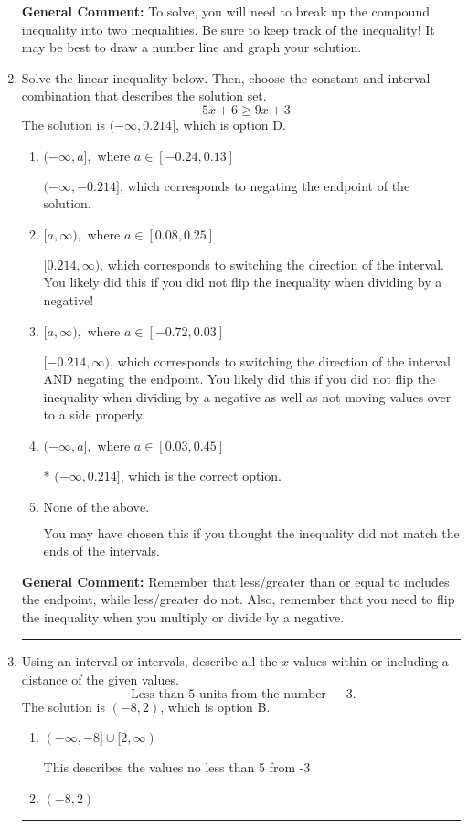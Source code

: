 \documentclass{extbook}[14pt]
\newcommand{\litem}[1]{\item #1

\rule{\textwidth}{0.4pt}}
\begin{document}
\begin{enumerate}
{\textbf{General Comment:} To solve, you will need to break up the compound inequality into two inequalities. Be sure to keep track of the inequality! It may be best to draw a number line and graph your solution.
}
\litem{
Solve the linear inequality below. Then, choose the constant and interval combination that describes the solution set.
\[ -5x + 6 \geq 9x + 3 \]The solution is \( (-\infty, 0.214] \), which is option D.\begin{enumerate}[label=\Alph*.]
\item \( (-\infty, a], \text{ where } a \in [-0.24, 0.13] \)

 $(-\infty, -0.214]$, which corresponds to negating the endpoint of the solution.
\item \( [a, \infty), \text{ where } a \in [0.08, 0.25] \)

 $[0.214, \infty)$, which corresponds to switching the direction of the interval. You likely did this if you did not flip the inequality when dividing by a negative!
\item \( [a, \infty), \text{ where } a \in [-0.72, 0.03] \)

 $[-0.214, \infty)$, which corresponds to switching the direction of the interval AND negating the endpoint. You likely did this if you did not flip the inequality when dividing by a negative as well as not moving values over to a side properly.
\item \( (-\infty, a], \text{ where } a \in [0.03, 0.45] \)

* $(-\infty, 0.214]$, which is the correct option.
\item \( \text{None of the above}. \)

You may have chosen this if you thought the inequality did not match the ends of the intervals.
\end{enumerate}

\textbf{General Comment:} Remember that less/greater than or equal to includes the endpoint, while less/greater do not. Also, remember that you need to flip the inequality when you multiply or divide by a negative.
}
\litem{
Using an interval or intervals, describe all the $x$-values within or including a distance of the given values.
\[ \text{ Less than } 5 \text{ units from the number } -3. \]The solution is \( (-8, 2) \), which is option B.\begin{enumerate}[label=\Alph*.]
\item \( (-\infty, -8] \cup [2, \infty) \)

This describes the values no less than 5 from -3
\item \( (-8, 2) \)


\end{enumerate}}
\end{enumerate}
\end{document}
